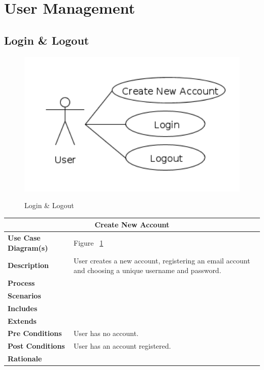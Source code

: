 \documentclass[12pt]{article}
\begin{document}
\newpage
\section{User Management}

\subsection{Login \& Logout}

\begin{figure}[H]
\caption{Login \& Logout}
\centering
\includegraphics[width = 1\textwidth]{CreateNewAccount.png}
\label{useCaseDiagram:LoginOut}
\end{figure}

\begin{center}
\begin{tabularx}{\textwidth}{ |X|X|}
\hline
\multicolumn{2}{|c|}{\textbf{Create New Account}}\\
\hline
\hline
\textbf{Use Case Diagram(s)} & Figure ~\ref{useCaseDiagram:LoginOut}\\ \hline
\textbf{Description} & User creates a new account, registering an email account and choosing a unique username and password.\\ \hline
\textbf{Process} & \\ \hline
\textbf{Scenarios} & \\ \hline
\textbf{Includes} & \\ \hline
\textbf{Extends} & \\ \hline
\textbf{Pre Conditions} & User has no account.\\ \hline
\textbf{Post Conditions} & User has an account registered.\\ \hline
\textbf{Rationale} & \\ \hline
\end{tabularx}
\end{center}
\end{document}
